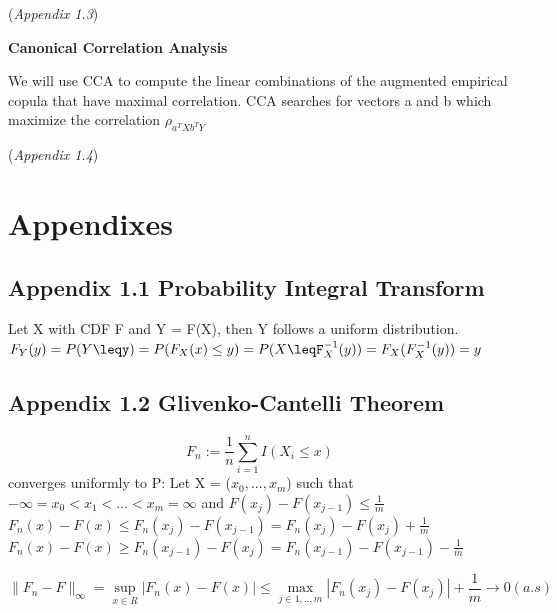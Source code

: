 \documentclass[11pt,twoside,a4paper]{article}
\begin{document}
(\textit{Appendix 1.3})

\begin{flushleft}

\textbf{Canonical Correlation Analysis}

We will use CCA to compute the linear combinations of the augmented empirical copula that have maximal correlation.
CCA searches for vectors a and b which maximize the correlation $\rho_{a^TXb^TY}$

(\textit{Appendix 1.4})
\section*{Appendixes}
\subsection*{Appendix 1.1 Probability Integral Transform}
Let X with CDF F and Y = F(X), then Y follows a uniform distribution.
$F_{Y}(y)=P(Y\leqy)=P(F_{X}(x)\leq y) = P(X\leqF^{-1}_{X}(y)) = F_{X}(F^{-1}_{X}(y)) = y$
\subsection*{Appendix 1.2 Glivenko-Cantelli Theorem}
$$F_{n} := \frac{1}{n} \sum_{i=1}^{n} \textit{I}(X_{i} \leq x)$$ converges uniformly to P:
Let X = ($x_{0},...,x_{m}$) such that $-\infty = x_{0}<x_{1}< ... <x_{m}=\infty$ and $ F(x_{j}) - F(x_{j-1}) \leq \frac{1}{m}$
$F_{n}(x)-F(x)\leq F_{n}(x_{j})-F(x_{j-1}) = F_{n}(x_{j})-F(x_{j}) + \frac{1}{m}$
$F_{n}(x) - F(x) \geq F_{n}(x_{j-1}) -F(x_{j}) = F_{n}(x_{j-1}) -F(x_{j-1}) - \frac{1}{m}$
\end{flushleft}
$$\|F_{n} - F\|_{\infty}= \sup_{x \in R}|F_{n}(x) - F(x)| \leq \max_{j \in {1,..,m}}|F_{n}(x_{j})-F(x_{j})| + \frac{1}{m} \rightarrow 0 (a.s)$$
\end{document}
